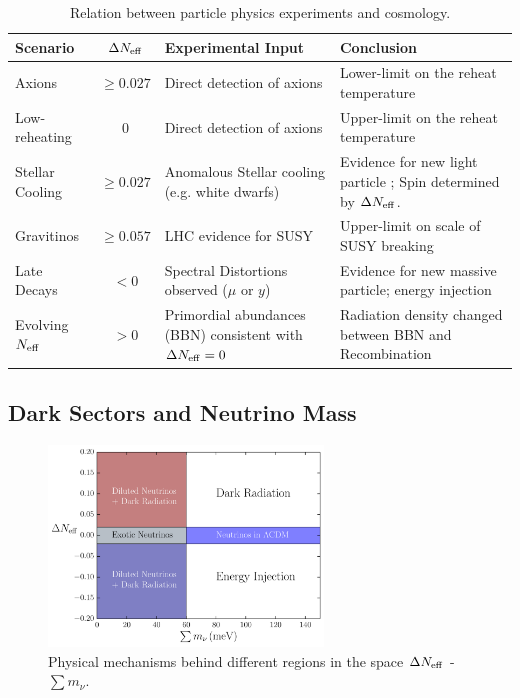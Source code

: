 \begin{table}[t!]
\begin{center}
\begin{tabular}
{| l | c | p{5cm} | p{5cm} | }\hline Scenario & $\Delta N_{\rm eff}$ & Experimental Input & Conclusion \\
\hline 
Axions & $\geq 0.027$  & Direct detection of axions & Lower-limit on the reheat temperature
\\[.2cm]
Low-reheating & $0$  & Direct detection of axions & Upper-limit on the reheat temperature
\\[.2cm]    
Stellar Cooling & $\geq 0.027$  & Anomalous Stellar cooling (e.g. white dwarfs) & Evidence for new light particle ; Spin determined by $\Delta N_{\rm eff}$.  
\\[.2cm]    
Gravitinos & $\geq 0.057$  & LHC evidence for SUSY & Upper-limit on scale of SUSY breaking
\\[.2cm]  
Late Decays & $< 0$  & Spectral Distortions observed ($\mu$ or $y$) & Evidence for new massive particle; energy injection
\\[.2cm]
Evolving $N_{\rm eff}$ & $> 0$  & Primordial abundances (BBN) consistent with $\Delta N_{\rm eff} =0$ & Radiation density changed between BBN and Recombination
\\[.2cm]  
\hline 
\end{tabular}
\caption{Relation between particle physics experiments and cosmology.}
\label{table:darkscenarios}
\end{center}
\end{table} 

\subsection{Dark Sectors and Neutrino Mass}




\begin{figure}[t!]
\begin{center}
\includegraphics[width=0.65\textwidth]{Neutrinos/MnuNeff.pdf}
\caption{ Physical mechanisms behind different regions in the space $\Delta N_{\rm eff}$ - $\sum m_\nu$.   }
\label{fig:MnuNeff}
\end{center}
\end{figure} 


